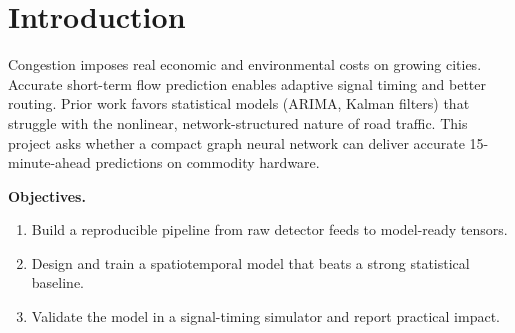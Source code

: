 \section{Introduction}
Congestion imposes real economic and environmental costs on growing cities. Accurate
short-term flow prediction enables adaptive signal timing and better routing. Prior work
favors statistical models (ARIMA, Kalman filters) that struggle with the nonlinear,
network-structured nature of road traffic. This project asks whether a compact graph
neural network can deliver accurate 15-minute-ahead predictions on commodity hardware.

\textbf{Objectives.}
\begin{enumerate}[leftmargin=1.4em,itemsep=2pt]
  \item Build a reproducible pipeline from raw detector feeds to model-ready tensors.
  \item Design and train a spatiotemporal model that beats a strong statistical baseline.
  \item Validate the model in a signal-timing simulator and report practical impact.
\end{enumerate}

